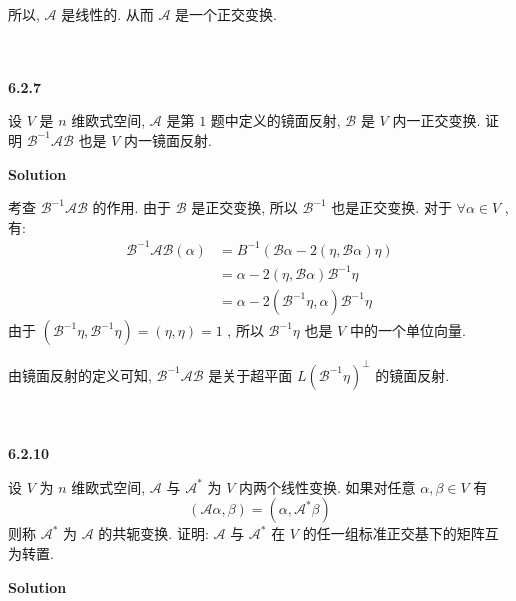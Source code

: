 \documentclass[11pt,a4paper,openany,oneside]{book}
\newcommand\Solution{\noindent\textbf{\textsf{Solution}}\par\medskip}
\begin{document}
所以,  $ \mathcal{A} $ 是线性的. 从而 $\mathcal{A}$ 是一个正交变换. \\  \\  \\  




\begin{myexample}
	\textbf{6.2.7}

设 $ V $ 是 $ n $ 维欧式空间,  $ \mathcal{A} $ 是第 $ 1 $ 题中定义的镜面反射,  $ \mathcal{B} $ 是 $ V $ 内一正交变换. 证明 $ \mathcal{B}^{-1}\mathcal{AB} $ 也是 $ V $ 内一镜面反射. \\

\end{myexample}
\Solution  

考查 $ \mathcal{B}^{-1}\mathcal{AB} $ 的作用. 由于 $ \mathcal{B} $ 是正交变换, 所以 $ \mathcal{B}^{-1} $ 也是正交变换. 对于 $ \forall \alpha \in V $ , 有:
\begin{align*}
\mathcal{B}^{-1}\mathcal{AB}(\alpha) &= B^{-1}(\mathcal{B}\alpha - 2(\eta, \mathcal{B}\alpha)\eta) \\
&= \alpha - 2(\eta, \mathcal{B}\alpha)\mathcal{B}^{-1}\eta \\
&= \alpha - 2(\mathcal{B}^{-1}\eta, \alpha)\mathcal{B}^{-1}\eta 
\end{align*}
由于 $ (\mathcal{B}^{-1}\eta, \mathcal{B}^{-1}\eta) = (\eta, \eta)=1 $ , 所以 $ \mathcal{B}^{-1}\eta $ 也是 $ V $ 中的一个单位向量. 

由镜面反射的定义可知,  $ \mathcal{B}^{-1}\mathcal{AB} $ 是关于超平面 $ L(\mathcal{B}^{-1}\eta)^{\perp} $ 的镜面反射.\\ \\ \\





\begin{myexample}
	\textbf{6.2.10}

设 $ V $ 为 $ n $ 维欧式空间,  $ \mathcal{A} $ 与 $ \mathcal{A}^* $ 为 $ V $ 内两个线性变换. 如果对任意 $ \alpha, \beta \in V $ 有
 $$  (\mathcal{A}\alpha, \beta) = (\alpha, \mathcal{A}^*\beta)  $$ 
则称 $ \mathcal{A}^* $ 为 $ \mathcal{A} $ 的共轭变换. 证明: $ \mathcal{A} $ 与 $ \mathcal{A}^* $ 在 $ V $ 的任一组标准正交基下的矩阵互为转置. \\

\end{myexample}
\Solution  
\end{document}
